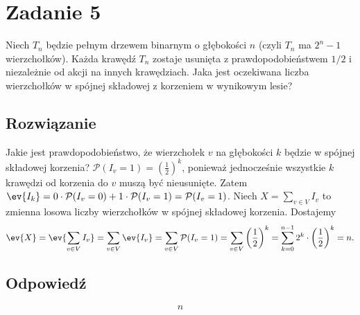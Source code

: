\section{Zadanie 5}
Niech \(T_n\) będzie pełnym drzewem binarnym o głębokości \(n\) (czyli \(T_n\) ma \(2^n - 1\) wierzchołków). Każda krawędź \(T_n\) zostaje usunięta z prawdopodobieństwem \(1/2\) i niezależnie od akcji na innych krawędziach. Jaka jest oczekiwana liczba wierzchołków w spójnej składowej z korzeniem w wynikowym lesie?

\subsection*{Rozwiązanie}
Jakie jest prawdopodobieństwo, że wierzchołek \(v\) na głębokości \(k\) będzie w spójnej składowej korzenia? \(\mathcal{P}(I_v = 1) = \left(\frac{1}{2}\right)^k\), ponieważ jednocześnie wszystkie \(k\) krawędzi od korzenia do \(v\) muszą być nieusunięte. Zatem \(\ev{I_k} = 0 \cdot \mathcal{P}(I_v = 0) + 1 \cdot \mathcal{P}(I_v = 1) = \mathcal{P}(I_v = 1)\). Niech \(X = \sum_{v \in V} I_v\) to zmienna losowa liczby wierzchołków w spójnej składowej korzenia. Dostajemy
\[
	\ev{X} = \ev{\sum_{v \in V} I_v} = \sum_{v \in V} \ev{I_v} = \sum_{v \in V} \mathcal{P}(I_v = 1) = \sum_{v \in V} \left(\frac{1}{2}\right)^k = \sum_{k=0}^{n-1} 2^k \cdot \left(\frac{1}{2}\right)^k = n.
\]

\subsection*{Odpowiedź}
\[
	\boxed{n}
\]
